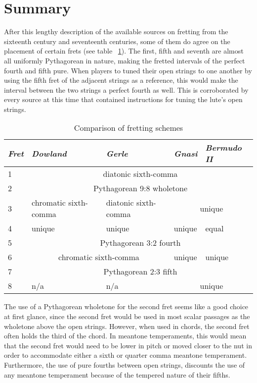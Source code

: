 \section{Summary}
After this lengthy description of the available sources on fretting from the sixteenth
century and seventeenth centuries, some of them do agree on the placement of certain
frets (see table ~\ref{table:comparison}). The first, fifth and seventh are  almost all
uniformly Pythagorean in nature, making the fretted intervals of the perfect fourth and
fifth pure. When players to tuned their open strings to one another by using the fifth
fret of the adjacent strings as a reference, this would make the interval between the
two strings a perfect fourth as well.  This is corroborated by every source at this
time that contained instructions for tuning the lute's open strings.

\begin{table}[h!]
  \begin{center}
    \begin{tabular}{ l l l l l }
      \textit{Fret} & \textit{Dowland} & \textit{Gerle} & \textit{Gnasi} & \textit{Bermudo II} \\
      \hline
      1 & \multicolumn{4}{|c|}{\cellcolor[gray]{0.9}diatonic sixth-comma} \\
      2 & \multicolumn{4}{|c|}{\cellcolor[gray]{0.9}Pythagorean 9:8 wholetone} \\
      3 & chromatic sixth-comma & diatonic sixth-comma & \multicolumn{2}{|c|}{\cellcolor[gray]{0.9}unique} \\
      4 & unique & unique & unique & equal \\
      5 & \multicolumn{4}{|c|}{\cellcolor[gray]{0.9}Pythagorean 3:2 fourth} \\
      6 & \multicolumn{2}{|c|}{\cellcolor[gray]{0.9}chromatic sixth-comma} & unique & unique \\
      7 & \multicolumn{4}{|c|}{\cellcolor[gray]{0.9}Pythagorean 2:3 fifth} \\
      8 & n/a & n/a & \multicolumn{2}{|c|}{\cellcolor[gray]{0.9}unique} \\
    \end{tabular}
  \end{center}
  \caption{Comparison of fretting schemes}
  \label{table:comparison}
\end{table}

The use of a Pythagorean wholetone for the second fret seems like a good choice at
first glance, since the second fret would be used in most scalar passages as the
wholetone above the open strings.  However, when used in chords, the second fret often
holds the third of the chord. In meantone temperaments, this would mean that the second
fret would need to be lower in pitch or moved closer to the nut in order to accommodate
either a sixth or quarter comma meantone temperament.  Furthermore, the use of pure
fourths between open strings, discounts the use of any meantone temperament because of
the tempered nature of their fifths.

